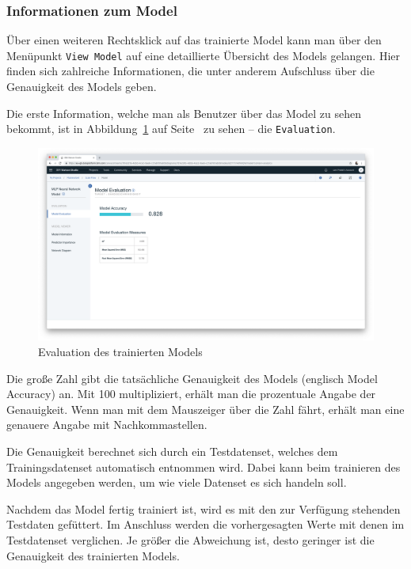 \subsubsection{Informationen zum Model}
Über einen weiteren Rechtsklick auf das trainierte Model kann man über den Menüpunkt \texttt{View Model} auf eine
detaillierte Übersicht des Models gelangen. Hier finden sich zahlreiche Informationen, die unter anderem Aufschluss
über die Genauigkeit des Models geben.

Die erste Information, welche man als Benutzer über das Model zu sehen bekommt, ist in
Abbildung~\ref{fig:umsetzung_model_evaluation} auf Seite~\pageref{fig:umsetzung_model_evaluation} zu sehen -- die
\texttt{Evaluation}.

\begin{figure}[h]
    \centering
    \includegraphics[width=\textwidth]{images/kapitel_3/model_evaluation.png}
    \caption{Evaluation des trainierten Models}
    \label{fig:umsetzung_model_evaluation}
\end{figure}

Die große Zahl gibt die tatsächliche Genauigkeit des Models (englisch Model Accuracy) an. Mit 100 multipliziert, erhält
man die prozentuale Angabe der Genauigkeit. Wenn man mit dem Mauszeiger über die Zahl fährt, erhält man eine genauere
Angabe mit Nachkommastellen.

Die Genauigkeit berechnet sich durch ein Testdatenset, welches dem Trainingsdatenset automatisch entnommen wird. Dabei
kann beim trainieren des Models angegeben werden, um wie viele Datenset es sich handeln soll.

Nachdem das Model fertig trainiert ist, wird es mit den zur Verfügung stehenden Testdaten gefüttert. Im Anschluss werden
die vorhergesagten Werte mit denen im Testdatenset verglichen. Je größer die Abweichung ist, desto geringer ist die
Genauigkeit des trainierten Models.

